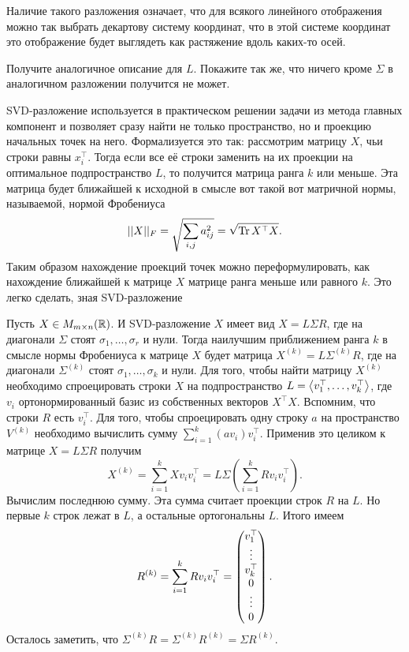 \endproof
\ethrm

Наличие такого разложения означает, что для всякого линейного отображения можно так выбрать декартову систему координат, что в этой системе координат это отображение будет выглядеть как растяжение вдоль каких-то осей.

\zd Получите аналогичное описание для $L$. Покажите так же, что ничего кроме $\Sigma$ в аналогичном разложении получится не может.
\ezd

SVD-разложение используется в практическом решении задачи из метода главных компонент и позволяет сразу найти не только пространство, но и проекцию начальных точек на него. Формализуется это так: рассмотрим матрицу $X$, чьи строки равны $x_i^{\top}$. Тогда если все её строки заменить на их проекции на оптимальное подпространство $L$, то получится матрица ранга $k$ или меньше. Эта матрица будет ближайшей к исходной в смысле вот такой вот матричной нормы, называемой, нормой Фробениуса 
$$||X||_F=\sqrt{\sum_{i,j} a_{ij}^2}=\sqrt{\operatorname{Tr} X^{\top}X}.$$
Таким образом нахождение проекций точек можно переформулировать, как нахождение ближайшей к матрице $X$ матрице ранга меньше или равного $k$. Это легко сделать, зная SVD-разложение

\thrm Пусть $X\in M_{m\times n}(\mathbb{R})$. И SVD-разложение $X$ имеет вид $X=L\Sigma R$, где на диагонали $\Sigma$ стоят $\sigma_1,\dots,\sigma_r$ и нули. Тогда наилучшим приближением ранга $k$ в смысле нормы Фробениуса к матрице $X$ будет матрица $X^{(k)}=L\Sigma^{(k)}R$, где на диагонали $\Sigma^{(k)}$ стоят $\sigma_1,\dots,\sigma_{k}$ и нули.
\proof Для того, чтобы найти матрицу $X^{(k)}$ необходимо спроецировать строки $X$ на подпространство $L=\left\langle v_1^{\top},\dots,v_k^{\top}\right\rangle$, где $v_i$ ортонормированный базис из собственных векторов $X^{\top}X$.  Вспомним, что строки $R$ есть $v_i^{\top}$. Для того, чтобы спроецировать одну строку $a$ на пространство $V^{(k)}$ необходимо вычислить сумму $\sum_{i=1}^k (av_i)v_i^{\top}$. Применив это целиком к матрице $X=L\Sigma R$ получим 
$$X^{(k)}=\sum_{i=1}^k Xv_iv_i^{\top}=L\Sigma \left(\sum_{i=1}^k Rv_iv_i^{\top}\right).$$
Вычислим последнюю сумму. Эта сумма считает проекции строк $R$ на $L$. Но первые $k$ строк лежат в $L$, а остальные ортогональны $L$. Итого имеем
$$R^{(k)}=\sum_{i=1}^k Rv_iv_i^{\top} = \begin{pmatrix} v_1^{\top} \\ \vdots \\ v_k^{\top} \\ 0 \\ \vdots \\ 0 \end{pmatrix}.$$
Осталось заметить, что $\Sigma^{(k)} R= \Sigma^{(k)}R^{(k)}=\Sigma R^{(k)}$.
\endproof
\ethrm 

